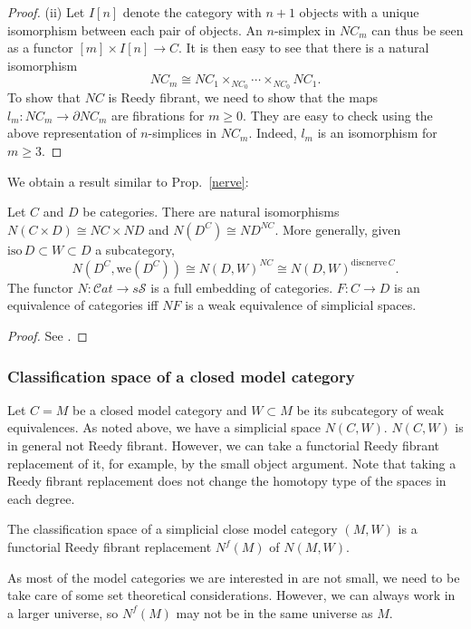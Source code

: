 \begin{refsection}
\begin{proof}
(ii) Let $I[n]$ denote the category with $n+1$ objects with a unique isomorphism between each pair of objects. An $n$-simplex in $NC_m$ can thus be seen as a functor $[m]\times I[n]\to C$. It is then easy to see that there is a natural isomorphism
$$NC_m\cong NC_1\times_{NC_0}\cdots\times_{NC_0}NC_1.$$
To show that $NC$ is Reedy fibrant, we need to show that the maps $l_m:NC_m\to\partial NC_m$ are fibrations for $m\ge0$. They are easy to check using the above representation of $n$-simplices in $NC_m$. Indeed, $l_m$ is an isomorphism for $m\ge 3$.
\end{proof}

We obtain a result similar to Prop.~\ref{nerve}:
\begin{prop}\label{nerveprop}
Let $C$ and $D$ be categories. There are natural isomorphisms $N(C\times D)\cong NC\times ND$ and $N(D^C)\cong ND^{NC}$. More generally, given $\mathrm{iso}\,D\subset W\subset D$ a subcategory,
\begin{equation} \label{nfuncat}
N(D^C,\mathrm{we}(D^C))\cong N(D,W)^{NC}\cong N(D,W)^{\mathrm{discnerve}\,C}.
\end{equation}
The functor $N:{\mathcal{C}}at\to s\mathcal S$ is a full embedding of categories. $F:C\to D$ is an equivalence of categories iff $NF$ is a weak equivalence of simplicial spaces.
\end{prop}
\begin{proof}
See \cite[Thm 3.7, Prop 3.11]{rezk}.
\end{proof}

\subsubsection{Classification space of a closed model category}
Let $C=M$ be a closed model category and $W\subset M$ be its subcategory of weak equivalences. As noted above, we have a simplicial space $N(C,W)$. $N(C,W)$ is in general not Reedy fibrant. However, we can take a functorial Reedy fibrant replacement of it, for example, by the small object argument. Note that taking a Reedy fibrant replacement does not change the homotopy type of the spaces in each degree.

\begin{defin}
The classification space of a simplicial close model category $(M,W)$ is a functorial Reedy fibrant replacement $N^f(M)$ of $N(M,W)$.
\end{defin}

As most of the model categories we are interested in are not small, we need to be take care of some set theoretical considerations. However, we can always work in a larger universe, so $N^f(M)$ may not be in the same universe as $M$.


\end{refsection}
